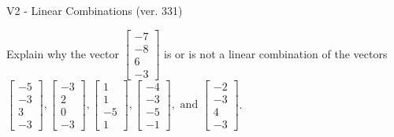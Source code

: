 \begin{exercise}
  \begin{exerciseTitle}V2 - Linear Combinations (ver. 331)\end{exerciseTitle}
  \begin{exerciseStatement}
    Explain why the vector \(\left[\begin{array}{c}
-7 \\
-8 \\
6 \\
-3
\end{array}\right]\)  is or is not a linear 
	combination of the vectors \(\left[\begin{array}{c}
-5 \\
-3 \\
3 \\
-3
\end{array}\right] , \left[\begin{array}{c}
-3 \\
2 \\
0 \\
-3
\end{array}\right] , \left[\begin{array}{c}
1 \\
1 \\
-5 \\
1
\end{array}\right] , \left[\begin{array}{c}
-4 \\
-3 \\
-5 \\
-1
\end{array}\right] , \text{ and } \left[\begin{array}{c}
-2 \\
-3 \\
4 \\
-3
\end{array}\right]\).
	



\end{exerciseStatement}
\end{exercise}
